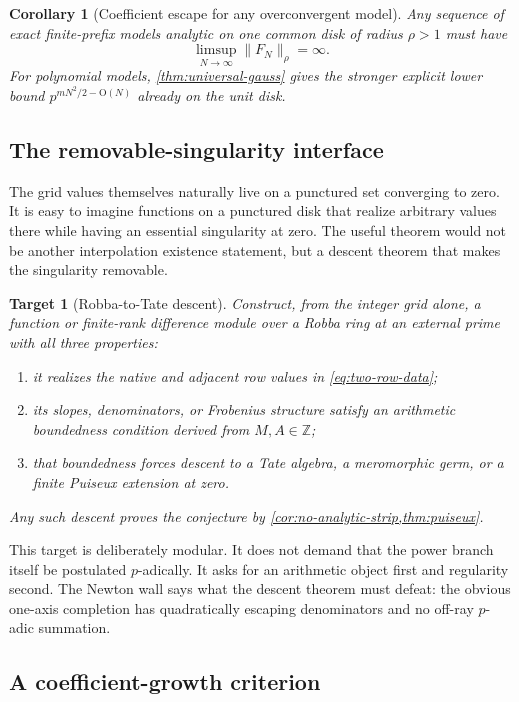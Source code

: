 \documentclass[11pt,oneside]{article}
\newtheorem{corollary}[theorem]{Corollary}
\newtheorem{target}[theorem]{Target}
\theoremstyle{definition}
\newcommand{\Z}{\mathbb Z}
\newcommand{\bigO}{\mathrm O}
\begin{document}
\begin{corollary}[Coefficient escape for any overconvergent model]
Any sequence of exact finite-prefix models analytic on one common disk of radius
$\rho>1$ must have
\[
 \limsup_{N\to\infty}\lVert F_N\rVert_\rho=\infty.
\]
For polynomial models, \cref{thm:universal-gauss} gives the stronger explicit lower bound
$p^{mN^2/2-\bigO(N)}$ already on the unit disk.
\end{corollary}

\subsection{The removable-singularity interface}

The grid values themselves naturally live on a punctured set converging to zero.  It is easy
to imagine functions on a punctured disk that realize arbitrary values there while having an
essential singularity at zero.  The useful theorem would not be another interpolation
existence statement, but a descent theorem that makes the singularity removable.

\begin{target}[Robba-to-Tate descent]\label{target:robba-tate}
Construct, from the integer grid alone, a function or finite-rank difference module over a
Robba ring at an external prime with all three properties:
\begin{enumerate}[label=(\roman*)]
\item it realizes the native and adjacent row values in \eqref{eq:two-row-data};
\item its slopes, denominators, or Frobenius structure satisfy an arithmetic boundedness
  condition derived from $M,A\in\Z$;
\item that boundedness forces descent to a Tate algebra, a meromorphic germ, or a finite
  Puiseux extension at zero.
\end{enumerate}
Any such descent proves the conjecture by
\cref{cor:no-analytic-strip,thm:puiseux}.
\end{target}

This target is deliberately modular.  It does not demand that the power branch itself be
postulated $p$-adically.  It asks for an arithmetic object first and regularity second.  The
Newton wall says what the descent theorem must defeat: the obvious one-axis completion has
quadratically escaping denominators and no off-ray $p$-adic summation.

\subsection{A coefficient-growth criterion}
\end{document}

